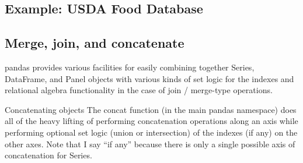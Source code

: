 \documentclass[11pt]{article} %
\begin{document}
\subsection{Example: USDA Food Database}


\newpage
\subsection*{Merge, join, and concatenate}

pandas provides various facilities for easily combining together Series, DataFrame, and Panel objects with various kinds of set logic for the indexes and relational algebra
functionality in the case of join / merge-type operations.




Concatenating objects
The concat function (in the main pandas namespace) does all of the heavy lifting of performing concatenation operations along an axis while performing optional set logic (union or intersection) of the indexes (if any) on the other axes. Note that I say “if any” because there is only a single possible axis of concatenation for Series.
\end{document}
